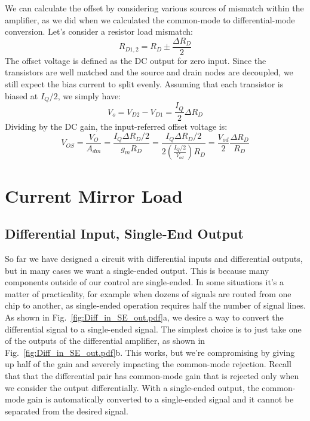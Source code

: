 We can calculate the offset by considering various sources of mismatch within the amplifier, as we did when we calculated the common-mode to differential-mode conversion.  Let's consider a resistor load mismatch:
%
\begin{equation} 
	{R_{D1,2}} = {R_D} \pm \frac{ \Delta {R_D}}{2} 
\end{equation}
%
The offset voltage is defined as the DC output for zero input.  Since the transistors are well matched and the source and drain nodes are decoupled, we still expect the bias current to split evenly.  Assuming that each transistor is biased at $I_Q/2$, we simply have:
%
\begin{equation}
	{V_o} = {V_{D2}} - {V_{D1}} = \frac{I_Q}{2}\Delta {R_D}
\end{equation}
%
Dividing by the DC gain, the input-referred offset voltage is:
%
\begin{equation}
	{V_{OS}} = \frac{{{V_O}}}{{{A_{dm}}}} = \frac{{I_Q\Delta {R_D}/2}}{{{g_m}{R_D}}} 
	  = \frac{{I_Q\Delta {R_D}/2}}{{2\left( {\frac{{I_Q/2}}{{{V_{od}}}}} \right){R_D}}} 
	  = \frac{{{V_{od}}}}{2}\frac{{\Delta {R_D}}}{{{R_D}}}
\end{equation}
%







\section{Current Mirror Load}




\subsection{Differential Input, Single-End Output}

So far we have designed a circuit with differential inputs and differential outputs, but in many cases we want a single-ended output.  This is because many components outside of our control are single-ended.  In some situations it's a matter of practicality, for example when dozens of signals are routed from one chip to another, as single-ended operation requires half the number of signal lines.  As shown in Fig.~\ref{fig:Diff_in_SE_out.pdf}a, we desire a way to convert the differential signal to a single-ended signal.  The simplest choice is to just take one of the outputs of the differential amplifier, as shown in Fig.~\ref{fig:Diff_in_SE_out.pdf}b.   This works, but we're compromising by giving up half of the gain and severely impacting the common-mode rejection.  Recall that that the differential pair has common-mode gain that is rejected only when we consider the output differentially.  With a single-ended output, the common-mode gain is automatically converted to a single-ended signal and it cannot be separated from the desired signal.


